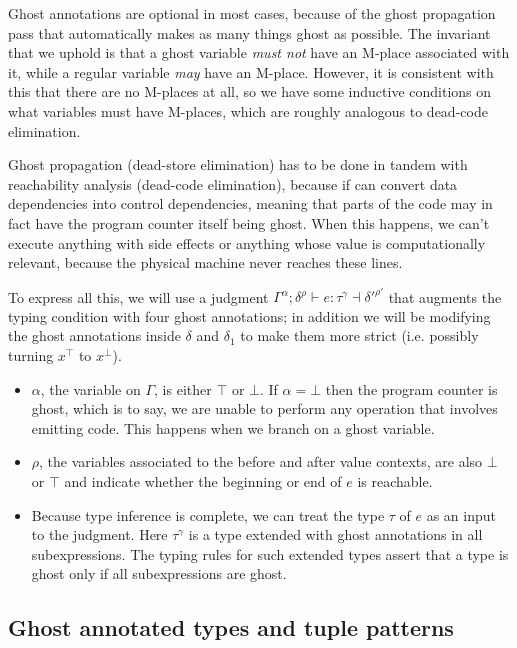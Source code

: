 \documentclass[acmsmall,nonacm]{acmart}
\newcommand{\proves}{\vdash}
\newcommand{\makes}{\dashv}
\begin{document}
Ghost annotations are optional in most cases, because of the ghost propagation pass that automatically makes as many things ghost as possible. The invariant that we uphold is that a ghost variable \emph{must not} have an M-place associated with it, while a regular variable \emph{may} have an M-place. However, it is consistent with this that there are no M-places at all, so we have some inductive conditions on what variables must have M-places, which are roughly analogous to dead-code elimination.

Ghost propagation (dead-store elimination) has to be done in tandem with reachability analysis (dead-code elimination), because \textsf{if} can convert data dependencies into control dependencies, meaning that parts of the code may in fact have the program counter itself being ghost. When this happens, we can't execute anything with side effects or anything whose value is computationally relevant, because the physical machine never reaches these lines.

To express all this, we will use a judgment $\Gamma^\alpha;\delta^\rho\proves e:\tau^\gamma\makes {\delta'}^{\rho'}$ that augments the typing condition with four ghost annotations; in addition we will be modifying the ghost annotations inside $\delta$ and $\delta_1$ to make them more strict (i.e. possibly turning $x^\top$ to $x^\bot$).

\begin{itemize}
  \item $\alpha$, the variable on $\Gamma$, is either $\top$ or $\bot$. If $\alpha=\bot$ then the program counter is ghost, which is to say, we are unable to perform any operation that involves emitting code. This happens when we branch on a ghost variable.
  \item $\rho$, the variables associated to the before and after value contexts, are also $\bot$ or $\top$ and indicate whether the beginning or end of $e$ is reachable.
  \item Because type inference is complete, we can treat the type $\tau$ of $e$ as an input to the judgment. Here $\tau^{\gamma}$ is a type extended with ghost annotations in all subexpressions. The typing rules for such extended types assert that a type is ghost only if all subexpressions are ghost.
\end{itemize}

\subsection{Ghost annotated types and tuple patterns}
\end{document}
